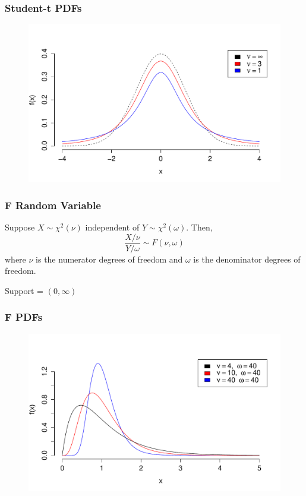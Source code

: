 \documentclass[handout]{beamer}
\begin{document}
\begin{frame}
\frametitle{Student-t PDFs}

\begin{figure}
\includegraphics[scale = 0.58]{./images/tpdf}
\end{figure}
\end{frame}

\begin{frame}
\frametitle{F Random Variable}
Suppose $X \sim \chi^2(\nu)$ independent of $Y \sim \chi^2(\omega)$. Then,
	$$\frac{X/\nu}{Y/\omega} \sim F(\nu, \omega)$$
where $\nu$ is the numerator degrees of freedom and $\omega$ is the denominator degrees of freedom.
\vspace{1em}


\alert{Support = $(0, \infty)$}\\

\end{frame}




\begin{frame}
\frametitle{F PDFs}

\begin{figure}
\includegraphics[scale = 0.58]{./images/Fdist}
\end{figure}
\end{frame}
\end{document}
